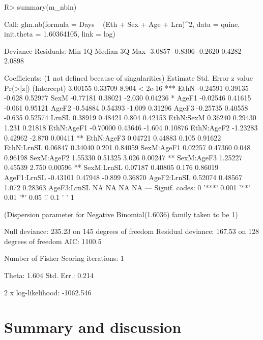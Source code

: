 \documentclass[article]{jss}
\begin{document}
\begin{CodeChunk}
\begin{CodeInput}
R> summary(m_nbin)
\end{CodeInput}
\begin{CodeOutput}
Call:
glm.nb(formula = Days ~ (Eth + Sex + Age + Lrn)^2, data = quine, 
    init.theta = 1.60364105, link = log)

Deviance Residuals: 
    Min       1Q   Median       3Q      Max  
-3.0857  -0.8306  -0.2620   0.4282   2.0898  

Coefficients: (1 not defined because of singularities)
            Estimate Std. Error z value Pr(>|z|)    
(Intercept)  3.00155    0.33709   8.904  < 2e-16 ***
EthN        -0.24591    0.39135  -0.628  0.52977    
SexM        -0.77181    0.38021  -2.030  0.04236 *  
AgeF1       -0.02546    0.41615  -0.061  0.95121    
AgeF2       -0.54884    0.54393  -1.009  0.31296    
AgeF3       -0.25735    0.40558  -0.635  0.52574    
LrnSL        0.38919    0.48421   0.804  0.42153    
EthN:SexM    0.36240    0.29430   1.231  0.21818    
EthN:AgeF1  -0.70000    0.43646  -1.604  0.10876    
EthN:AgeF2  -1.23283    0.42962  -2.870  0.00411 ** 
EthN:AgeF3   0.04721    0.44883   0.105  0.91622    
EthN:LrnSL   0.06847    0.34040   0.201  0.84059    
SexM:AgeF1   0.02257    0.47360   0.048  0.96198    
SexM:AgeF2   1.55330    0.51325   3.026  0.00247 ** 
SexM:AgeF3   1.25227    0.45539   2.750  0.00596 ** 
SexM:LrnSL   0.07187    0.40805   0.176  0.86019    
AgeF1:LrnSL -0.43101    0.47948  -0.899  0.36870    
AgeF2:LrnSL  0.52074    0.48567   1.072  0.28363    
AgeF3:LrnSL       NA         NA      NA       NA    
---
Signif. codes:  0 '***' 0.001 '**' 0.01 '*' 0.05 '.' 0.1 ' ' 1

(Dispersion parameter for Negative Binomial(1.6036) family taken to be 1)

    Null deviance: 235.23  on 145  degrees of freedom
Residual deviance: 167.53  on 128  degrees of freedom
AIC: 1100.5

Number of Fisher Scoring iterations: 1


              Theta:  1.604 
          Std. Err.:  0.214 

 2 x log-likelihood:  -1062.546 
\end{CodeOutput}
\end{CodeChunk}




\section{Summary and discussion} \label{sec:summary}
\end{document}
